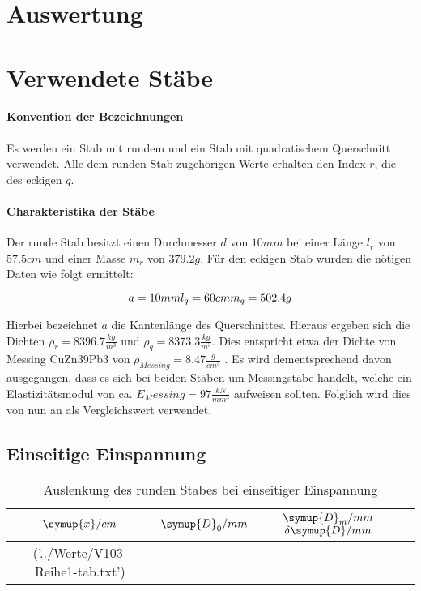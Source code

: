 \section{Auswertung}
\label{sec:Auswertung}

\section{Verwendete Stäbe}
\label{sec:Stäbe}
\paragraph{Konvention der Bezeichnungen}
\label{sec:Konvention}
Es werden ein Stab mit rundem und ein Stab mit quadratischem Querschnitt verwendet. Alle dem runden Stab zugehörigen Werte erhalten den Index $r$, die des eckigen $q$.

\paragraph{Charakteristika der Stäbe}
Der runde Stab besitzt einen Durchmesser $d$ von $10mm$ bei einer Länge $l_{r}$ von $57.5cm$ und einer Masse $m_{r}$ von $379.2g$.
Für den eckigen Stab wurden die nötigen Daten wie folgt ermittelt:

\begin{equation*}
  a = 10mm \\
  l_{q} = 60cm \\
  m_{q} = 502.4g \\
\end{equation*}

Hierbei bezeichnet $a$ die Kantenlänge des Querschnittes. Hieraus ergeben sich die Dichten $\rho_{r} = 8396.7\frac{kg}{m^3}$ und $\rho_{q} = 8373.3\frac{kg}{m^3}$. Dies entspricht etwa der Dichte von  Messing CuZn39Pb3 von $\rho_{Messing} = 8.47\frac{g}{cm^3}$ \cite{DKI}. Es wird dementsprechend davon ausgegangen, dass es sich bei beiden Stäben um Messingstäbe handelt, welche ein Elastizitätsmodul von ca. $E_Messing = 97 \frac{kN}{mm^3}$ \cite{DKI} aufweisen sollten. Folglich wird dies von nun an als Vergleichswert verwendet. 

\subsection{Einseitige Einspannung}
\label{sec:Einseitig}

\begin{table}
  \centering
\caption{Auslenkung des runden Stabes bei einseitiger Einspannung}
\label{tab:rund}
\begin{tabular}{S S S S}
  \toprule
  {$\symup{x}/cm$} & {$\symup{D}_0/mm$} & {$\symup{D}_m/mm$} {$\delta \symup{D}/mm$}\\
  \midrule
  ('../Werte/V103-Reihe1-tab.txt')
\bottomrule
\end{tabular}
\end{table}
\FloatBarrier


